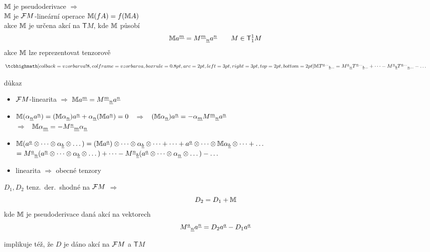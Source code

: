 \begin{veta}[T:]
$\mathbb{M}$ je pseudoderivace $\Rightarrow$ \\
\quad $\mathbb{M}$ je $\mathcal{F} M$-lineární operace \quad $\mathbb{M}(fA) = f(\mathbb{M} A)$ \\
\quad akce $\mathbb{M}$ je určena akcí na $\mathsf{T}M$, kde $\mathbb{M}$ působí
\[
  \mathbb{M} a^{\underline{m}} = M^{\underline{m}}{}_{\underline{n}}a^{\underline{n}} \qquad M\in\mathsf{T}^1_1M
\]
\quad akce $\mathbb{M}$ lze reprezentovat tenzorově
\[
  \vzorec{\gmIpM T^{\gmIpa\dots}{}_{\gmIpb\dots} = M^{\gmIpa}{}_{\underline{n}}T^{\underline{n}\dots}{}_{\gmIpb\dots} + \dots - M^{\underline{n}}{}_{\gmIpb}T^{\gmIpa\dots}{}_{\underline{n}\dots} - \dots}
\]
\end{veta}
důkaz
\begin{itemize}[nosep]
  \item[] $\mathcal{F} M$-linearita $\Rightarrow$ $\mathbb{M} a^{\underline{m}} = M^{\underline{m}}{}_{\underline{n}}a^{\underline{n}}$
  \item[] $\mathbb{M}(\alpha_{\underline{n}}a^{\underline{n}}) = (\mathbb{M}\alpha_{\underline{n}})a^{\underline{n}} + \alpha_{\underline{n}}(\mathbb{M} a^{\underline{n}}) = 0$
          \ $\Rightarrow$ \ $(\mathbb{M}\alpha_{\underline{n}})a^{\underline{n}} = -\alpha_{\underline{m}}M^{\underline{m}}{}_{\underline{n}}a^{\underline{n}}$ \\
          \quad $\Rightarrow$ \ $\mathbb{M}\alpha_{\underline{m}} = -M^{\underline{n}}{}_{\underline{m}}\alpha_{\underline{n}}$
  \item[] $\mathbb{M}(a^{\underline{a}}\otimes\dots\otimes\alpha_{\underline{b}}\otimes\dots) = (\mathbb{M} a^{\underline{a}})\otimes\dots\otimes\alpha_{\underline{b}}\otimes\dots + \dots + a^{\underline{a}}\otimes\dots\otimes\mathbb{M}\alpha_{\underline{b}}\otimes\dots + \dots$ \\
          \quad $= M^{\underline{a}}{}_{\underline{n}}(a^{\underline{n}}\otimes\dots\otimes\alpha_{\underline{b}}\otimes\dots) + \dots - M^{\underline{n}}{}_{\underline{b}}(a^{\underline{a}}\otimes\dots\otimes\alpha_{\underline{n}}\otimes\dots) - \dots$
  \item[] linearita $\Rightarrow$ obecné tenzory
\end{itemize}

\begin{veta}[T:]
$D_1, D_2$ tenz.\ der.\ shodné na $\mathcal{F} M$ \quad $\Rightarrow$
\[
  D_2 = D_1 + \mathbb{M}
\]
kde $\mathbb{M}$ je pseudoderivace daná akcí na vektorech
\[
  M^{\underline{a}}{}_{\underline{n}}a^{\underline{n}} = D_2a^{\underline{a}} - D_1a^{\underline{a}}
\]
\end{veta}
implikuje též, že $D$ je dáno akcí na $\mathcal{F} M$ a $\mathsf{T}M$

